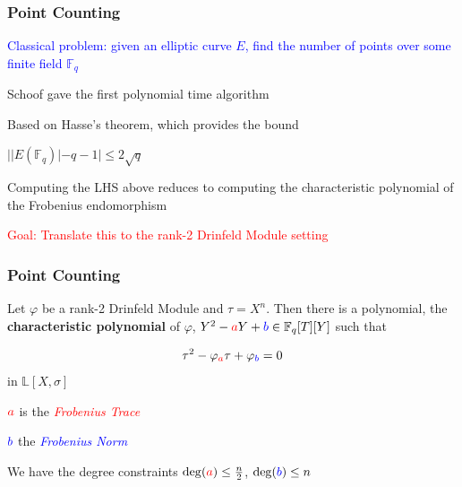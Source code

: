 \documentclass{beamer}
\newcommand{\blue}{\textcolor{blue}}
\newcommand{\red}{\textcolor{red}}
\newcommand{\spa}{\vspace{0.2cm}}
\begin{document}

\begin{frame}
\frametitle{Point Counting}


 \blue{Classical problem: given an elliptic curve $E$, find the number of points over some finite field $\mathbb{F}_q$} 
 
 \spa
 
Schoof gave the first polynomial time algorithm

\spa

Based on Hasse's theorem, which provides the bound 

\centerline {$ | |E(\mathbb{F}_q)| - q - 1  | \leq 2 \sqrt{q} $}

\spa

 Computing the LHS above reduces to computing the characteristic polynomial of the Frobenius endomorphism
 
 \spa
\red{Goal: Translate this to the rank-2 Drinfeld Module setting}


\end{frame}









\begin{frame}
\frametitle{Point Counting}

\begin{theorem}[Gekeler, 1991]
Let $\varphi$ be a rank-2 Drinfeld Module and $\tau = X^n$. Then there is a polynomial, the \textbf{characteristic polynomial} of $\varphi$,  $Y^2 - \red{a}Y +\blue{b} \in \mathbb{F}_q[T][Y]$ such that

\[\tau^2 -\varphi_{\red{a}}\tau + \varphi_{\blue{b}} = 0\]
in $\mathbb{L}[X,\sigma]$
\end{theorem}

\spa

$\red{a}$ is the \red{\textit{Frobenius Trace}}

\spa

$\blue{b}$ the \blue{\textit{Frobenius Norm}}

\spa

We have the degree constraints $\deg(\red{a}) \leq \frac{n}{2}$, $\deg(\blue{b}) \leq n$


\end{frame}
\end{document}
